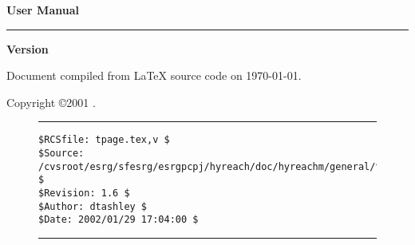 
\thispagestyle{empty}
\vspace*{0.0cm}
\begin{flushright}
\Huge\bfseries
\swname{} User Manual
\end{flushright}
\vspace{0.0cm}
\noindent\rule{\textwidth}{2pt}
\begin{flushright}
\huge\bfseries
Version \swversion{}
\end{flushright}
\vfill
\begin{flushright}
\begin{small}
\authors{}
\end{small}
\end{flushright}
\vspace{0.2cm}
\begin{flushright}
\begin{small}
Document compiled from \LaTeX{} source code on \today .
\end{small}
\end{flushright}
\vspace*{0.0cm}

\pagebreak
\thispagestyle{empty}
\begin{small}
  \noindent Copyright \copyright 2001 \authors{}.
\end{small}

\vfill

\noindent\begin{figure}[!b]
\noindent\rule[-0.25in]{\textwidth}{1pt}
\begin{tiny}
\begin{verbatim}
$RCSfile: tpage.tex,v $
$Source: /cvsroot/esrg/sfesrg/esrgpcpj/hyreach/doc/hyreachm/general/tpage.tex,v $
$Revision: 1.6 $
$Author: dtashley $
$Date: 2002/01/29 17:04:00 $
\end{verbatim}
\end{tiny}
\noindent\rule[0.25in]{\textwidth}{1pt}
\end{figure}
%
%
%
%
%
%

